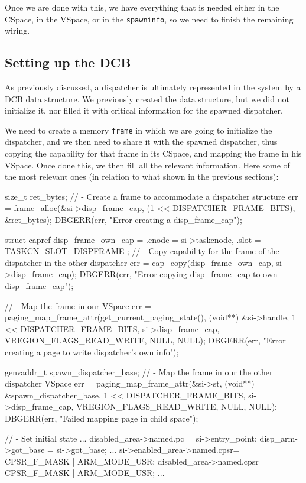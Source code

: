 \documentclass[a4paper,twoside,openright]{report}
\begin{document}
Once we are done with this, we have everything that is needed either in the CSpace, in the VSpace, or in the \texttt{spawninfo}, so we need to finish the remaining wiring.

\subsection{Setting up the DCB}
As previously discussed, a dispatcher is ultimately represented in the system by a DCB data structure.
We previously created the data structure, but we did not initialize it, nor filled it with critical information for the spawned dispatcher.

We need to create a memory \texttt{frame} in which we are going to initialize the dispatcher, and we then need to share it with the spawned dispatcher, thus copying the capability for that frame in its CSpace, and mapping the frame in his VSpace.
Once done this, we then fill all the relevant information.
Here some of the most relevant ones (in relation to what shown in the previous sections):
\begin{pandacode}
    size_t ret_bytes;
    // - Create a frame to accommodate a dispatcher structure
    err = frame_alloc(&si->disp_frame_cap,
            (1 << DISPATCHER_FRAME_BITS), &ret_bytes);
    DBGERR(err, "Error creating a disp_frame_cap\n");

    struct capref disp_frame_own_cap = {
        .cnode = si->taskcnode,
        .slot  = TASKCN_SLOT_DISPFRAME
    };
    // - Copy capability for the frame of the dispatcher in the other dispatcher
    err = cap_copy(disp_frame_own_cap, si->disp_frame_cap);
    DBGERR(err, "Error copying disp_frame_cap to own disp_frame_cap\n");

    // - Map the frame in our VSpace
    err = paging_map_frame_attr(get_current_paging_state(),
            (void**) &si->handle,
            1 << DISPATCHER_FRAME_BITS,
            si->disp_frame_cap,
            VREGION_FLAGS_READ_WRITE,
            NULL, NULL);
    DBGERR(err, "Error creating a page to write dispatcher's own info\n");

    genvaddr_t spawn_dispatcher_base;
    // - Map the frame in our the other dispatcher VSpace
    err = paging_map_frame_attr(&si->st,
            (void**) &spawn_dispatcher_base,
            1 << DISPATCHER_FRAME_BITS,
            si->disp_frame_cap,
            VREGION_FLAGS_READ_WRITE,
            NULL, NULL);
    DBGERR(err, "Failed mapping page in child space\n");

    // - Set initial state
    ...
    disabled_area->named.pc = si->entry_point;
    disp_arm->got_base = si->got_base;
    ...
    si->enabled_area->named.cpsr= CPSR_F_MASK | ARM_MODE_USR;
    disabled_area->named.cpsr= CPSR_F_MASK | ARM_MODE_USR;
    ...
\end{pandacode} 
\end{document}
